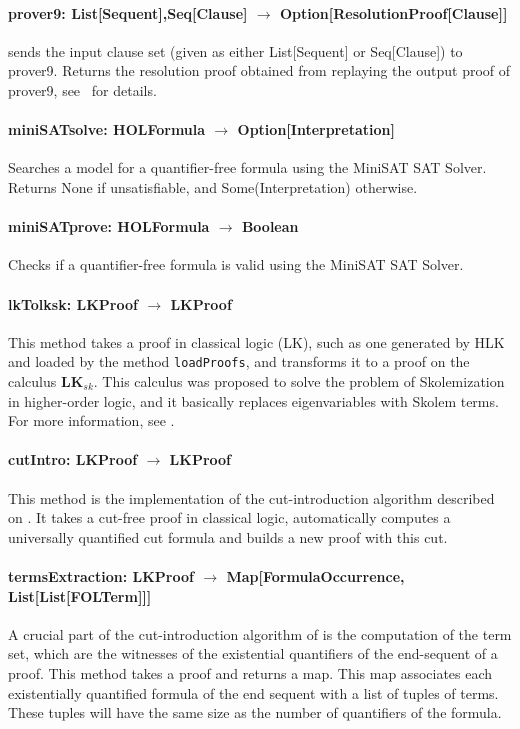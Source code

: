 \documentclass[a4paper,11pt]{article}
\begin{document}
\begin{appendix}
\paragraph{\textbf{prover9: List[Sequent],Seq[Clause] $\rightarrow$ Option[ResolutionProof[Clause]]}}
sends the input clause set (given as either List[Sequent] or Seq[Clause]) to prover9. Returns
the resolution proof obtained from replaying the output proof of prover9,
see~\cite{Dunchev12System} for details.

\paragraph{\textbf{miniSATsolve: HOLFormula $\rightarrow$ Option[Interpretation]}}
Searches a model for a quantifier-free formula using the MiniSAT SAT Solver.
Returns None if unsatisfiable, and Some(Interpretation) otherwise.

\paragraph{\textbf{miniSATprove: HOLFormula $\rightarrow$ Boolean}}
Checks if a quantifier-free formula is valid using the MiniSAT SAT Solver.

\paragraph{\textbf{lkTolksk: LKProof $\rightarrow$ LKProof}}
This method takes a proof in classical logic (LK), such as one generated by HLK and 
loaded by the method \texttt{loadProofs}, and transforms it to a proof on the
calculus $\mathbf{LK}_{sk}$. This calculus was proposed to solve the problem of
Skolemization in higher-order logic, and it basically replaces eigenvariables
with Skolem terms. For more information, see \cite{Hetzl2011}.

\paragraph{\textbf{cutIntro: LKProof $\rightarrow$ LKProof}}
This method is the implementation of the cut-introduction algorithm described on
\cite{Hetzl2012}. It takes a cut-free proof in classical logic, automatically
computes a universally quantified cut formula and builds a new proof with this
cut.

\paragraph{\textbf{termsExtraction: LKProof $\rightarrow$ Map[FormulaOccurrence, List[List[FOLTerm]]]}}
A crucial part of the cut-introduction algorithm of \cite{Hetzl2012} is the
computation of the term set, which are the witnesses of the existential
quantifiers of the end-sequent of a proof. This method takes a proof and returns
a map. This map associates each existentially quantified formula of the end
sequent with a list of tuples of terms. These tuples will have the same size as
the number of quantifiers of the formula.


\end{appendix}
\end{document}
